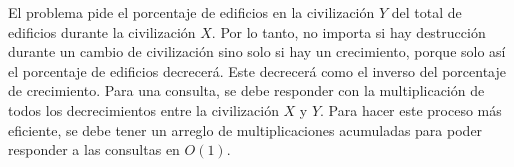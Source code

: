 
El problema pide el porcentaje de edificios en la civilización \(Y\) del total de edificios durante la civilización \(X\). Por lo tanto, no importa si hay destrucción durante un cambio de civilización sino solo si hay un crecimiento, porque solo así el porcentaje de edificios decrecerá. Este decrecerá como el inverso del porcentaje de crecimiento. Para una consulta, se debe responder con la multiplicación de todos los decrecimientos entre la civilización \(X\) y \(Y\). Para hacer este proceso más eficiente, se debe tener un arreglo de multiplicaciones acumuladas para poder responder a las consultas en \(O(1)\).

